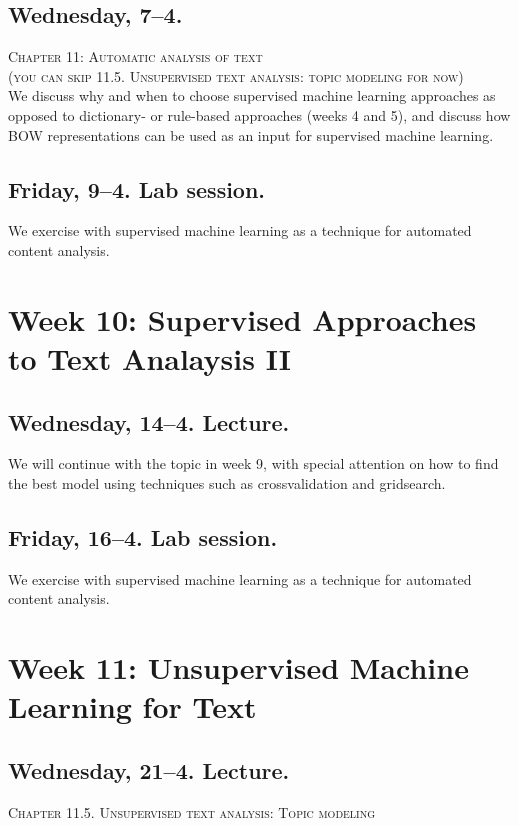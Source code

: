 \subsection*{Wednesday, 7--4.}
\textsc{ Chapter 11: Automatic analysis of text}\\
\textsc{ (you can skip 11.5. Unsupervised text analysis: topic modeling for now)}\\

We discuss why and when to choose supervised machine learning approaches as opposed to dictionary- or rule-based approaches (weeks 4 and 5), and discuss how BOW representations can be used as an input for supervised machine learning.

\subsection*{Friday, 9--4. Lab session.}
We exercise with supervised machine learning as a technique for automated content analysis.





\section*{Week 10: Supervised Approaches to Text Analaysis II}

\subsection*{Wednesday, 14--4. Lecture.}
We will continue with the topic in week 9, with special attention on how to find the best model using techniques such as crossvalidation and gridsearch.

\subsection*{Friday, 16--4. Lab session.}
We exercise with supervised machine learning as a technique for automated content analysis.



\section*{Week 11: Unsupervised Machine Learning for Text}

\subsection*{Wednesday, 21--4. Lecture.}
\textsc{ Chapter 11.5. Unsupervised text analysis: Topic modeling}\\

